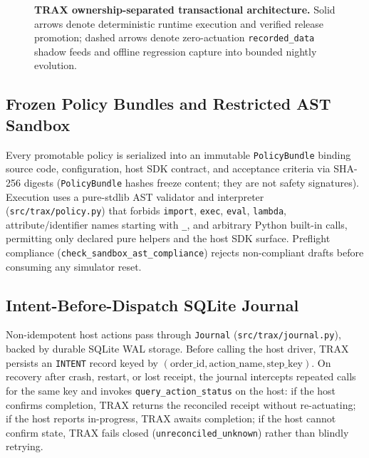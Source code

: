 \documentclass{trax}
\begin{document}
\begin{figure}[t]
{}
\caption{\textbf{TRAX ownership-separated transactional architecture.} Solid arrows denote deterministic runtime execution and verified release promotion; dashed arrows denote zero-actuation \texttt{recorded\_data} shadow feeds and offline regression capture into bounded nightly evolution.}
\label{fig:architecture}
\end{figure}

\subsection{Frozen Policy Bundles and Restricted AST Sandbox}
Every promotable policy is serialized into an immutable \texttt{PolicyBundle} binding source code, configuration, host SDK contract, and acceptance criteria via SHA-256 digests (\texttt{PolicyBundle} hashes freeze content; they are not safety signatures). Execution uses a pure-stdlib AST validator and interpreter (\texttt{src/trax/policy.py}) that forbids \texttt{import}, \texttt{exec}, \texttt{eval}, \texttt{lambda}, attribute/identifier names starting with \texttt{\_}, and arbitrary Python built-in calls, permitting only declared pure helpers and the host SDK surface. Preflight compliance (\texttt{check\_sandbox\_ast\_compliance}) rejects non-compliant drafts before consuming any simulator reset.

\subsection{Intent-Before-Dispatch SQLite Journal}
Non-idempotent host actions pass through \texttt{Journal} (\texttt{src/trax/journal.py}), backed by durable SQLite WAL storage. Before calling the host driver, TRAX persists an \texttt{INTENT} record keyed by $(\text{order\_id}, \text{action\_name}, \text{step\_key})$. On recovery after crash, restart, or lost receipt, the journal intercepts repeated calls for the same key and invokes \texttt{query\_action\_status} on the host: if the host confirms completion, TRAX returns the reconciled receipt without re-actuating; if the host reports in-progress, TRAX awaits completion; if the host cannot confirm state, TRAX fails closed (\texttt{unreconciled\_unknown}) rather than blindly retrying.
\end{document}
